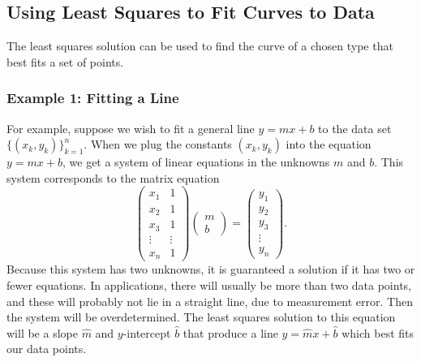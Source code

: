\subsection*{Using Least Squares to Fit Curves to Data}
The least squares solution can be used to find the curve of a chosen type that best fits a set of points. 

\subsubsection*{Example 1: Fitting a Line}
For example, suppose we wish to fit a general line $y=mx+b$ to the data set $\{(x_k, y_k)\}_{k=1}^n$. 
When we plug the constants $(x_k, y_k)$ into the equation $y=mx+b$, we get a system of linear equations in the unknowns $m$ and $b$. 
This system corresponds to the matrix equation
\[
\begin{pmatrix}
x_1 & 1\\
x_2 & 1\\
x_3 & 1\\
\vdots & \vdots\\
x_n & 1
\end{pmatrix}
\begin{pmatrix}
m\\
b
\end{pmatrix}=
\begin{pmatrix}
y_1\\
y_2\\
y_3\\
\vdots\\
y_n
\end{pmatrix}.
\]
Because this system has two unknowns, it is guaranteed a solution if it has two or fewer equations. 
In applications, there will usually be more than two data points, and these will probably not lie in a straight line, due to measurement error. 
Then the system will be overdetermined. 
The least squares solution to this equation will be a slope $\widehat{m}$ and $y$-intercept $\widehat{b}$ that produce a line $y = \widehat{m}x+\widehat{b}$ which best fits our data points.

